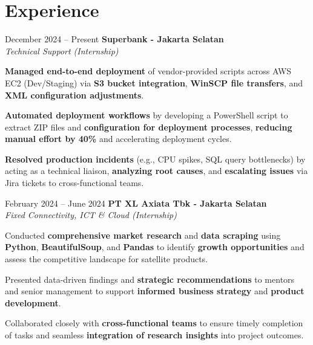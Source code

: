 \documentclass[../main.tex]{subfiles}
\begin{document}
\section{Experience}

\begin{twocolentry}{
		December 2024 – Present}
	\textbf{Superbank \color{Gray}- Jakarta Selatan}\\
	\textit{Technical Support (Internship)}
\end{twocolentry}

\vspace{0.10 cm}
\begin{onecolentry}
	\begin{highlights}
		\item \textbf{Managed end-to-end deployment} of vendor-provided scripts across AWS EC2 (Dev/Staging) via \textbf{S3 bucket integration}, \textbf{WinSCP file transfers}, and \textbf{XML configuration adjustments}.
		\item \textbf{Automated deployment workflows} by developing a PowerShell script to extract ZIP files and \textbf{configuration for deployment processes}, \textbf{reducing manual effort by 40\%} and accelerating deployment cycles.
		\item \textbf{Resolved production incidents} (e.g., CPU spikes, SQL query bottlenecks) by acting as a technical liaison, \textbf{analyzing root causes}, and \textbf{escalating issues} via Jira tickets to cross-functional teams.
	\end{highlights}
\end{onecolentry}

\vspace{0.40 cm}

\begin{twocolentry}{
		February 2024 – June 2024}
	\textbf{PT XL Axiata Tbk \color{Gray} - Jakarta Selatan}\\
	\textit{Fixed Connectivity, ICT \& Cloud (Internship)}
\end{twocolentry}

\vspace{0.10 cm}
\begin{onecolentry}
	\begin{highlights}
  \item Conducted \textbf{comprehensive market research} and \textbf{data scraping} using \textbf{Python}, \textbf{BeautifulSoup}, and \textbf{Pandas} to identify \textbf{growth opportunities} and assess the competitive landscape for satellite products.
  \item Presented data-driven findings and \textbf{strategic recommendations} to mentors and senior management to support \textbf{informed business strategy} and \textbf{product development}.
  \item Collaborated closely with \textbf{cross-functional teams} to ensure timely completion of tasks and seamless \textbf{integration of research insights} into project outcomes.
	\end{highlights}
\end{onecolentry}
\end{document}
